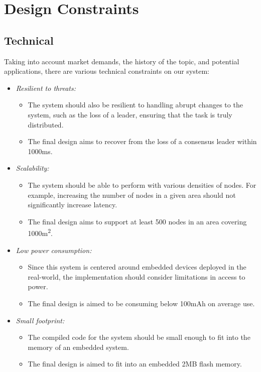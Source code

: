 \section{Design Constraints}
\subsection{Technical}

Taking into account market demands, the history of the topic, and potential applications, there are various technical constraints on our system:

\begin{itemize}
    \item \textit{Resilient to threats:}
    \begin{itemize}
        \item  The system should also be resilient to handling abrupt changes to the system, such as the loss of a leader, ensuring that the task is truly distributed. 
        \item The final design aims to recover from the loss of a consensus leader within 1000\si{\ms}.
    \end{itemize}
    
    \item \textit{Scalability:} 
    \begin{itemize}
        \item The system should be able to perform with various densities of nodes. For example, increasing the number of nodes in a given area should not significantly increase latency. 
        \item The final design aims to support at least 500 nodes in an area covering 1000\si{m^2}.
    \end{itemize}
    
    \item \textit{Low power consumption:}
    \begin{itemize}
        \item Since this system is centered around embedded devices deployed in the real-world, the implementation should consider limitations in access to power. 
        \item The final design is aimed to be consuming below 100\si{mAh} on average use.
    \end{itemize}
    
    \item \textit{Small footprint:} 
    \begin{itemize}
        \item The compiled code for the system should be small enough to fit into the memory of an embedded system. 
        \item The final design is aimed to fit into an embedded 2\si{MB} flash memory.
    \end{itemize}
\end{itemize}

